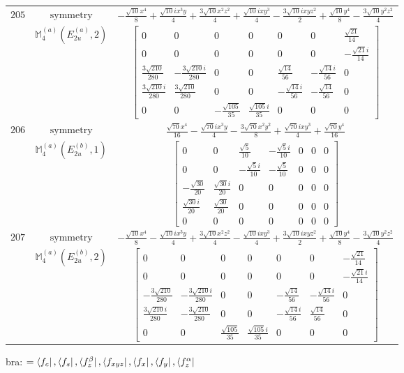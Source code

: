 \documentclass[fleqn,8pt,landscape]{jsarticle}
\begin{document}
\begin{longtable}{ccc}
$ 205 $ & $ \text{symmetry} $ & $ - \frac{\sqrt{10} x^{4}}{8} + \frac{\sqrt{10} i x^{3} y}{4} + \frac{3 \sqrt{10} x^{2} z^{2}}{4} + \frac{\sqrt{10} i x y^{3}}{4} - \frac{3 \sqrt{10} i x y z^{2}}{2} + \frac{\sqrt{10} y^{4}}{8} - \frac{3 \sqrt{10} y^{2} z^{2}}{4} $ \\
$  $ & $ \mathbb{M}_{4}^{(a)}(E_{2u}^{(a)},2) $ & $ \begin{bmatrix} 0 & 0 & 0 & 0 & 0 & 0 & \frac{\sqrt{21}}{14} \\ 0 & 0 & 0 & 0 & 0 & 0 & - \frac{\sqrt{21} i}{14} \\ \frac{3 \sqrt{210}}{280} & - \frac{3 \sqrt{210} i}{280} & 0 & 0 & \frac{\sqrt{14}}{56} & - \frac{\sqrt{14} i}{56} & 0 \\ \frac{3 \sqrt{210} i}{280} & \frac{3 \sqrt{210}}{280} & 0 & 0 & - \frac{\sqrt{14} i}{56} & - \frac{\sqrt{14}}{56} & 0 \\ 0 & 0 & - \frac{\sqrt{105}}{35} & \frac{\sqrt{105} i}{35} & 0 & 0 & 0 \end{bmatrix} $ \\ \hline
$ 206 $ & $ \text{symmetry} $ & $ \frac{\sqrt{70} x^{4}}{16} - \frac{\sqrt{70} i x^{3} y}{4} - \frac{3 \sqrt{70} x^{2} y^{2}}{8} + \frac{\sqrt{70} i x y^{3}}{4} + \frac{\sqrt{70} y^{4}}{16} $ \\
$  $ & $ \mathbb{M}_{4}^{(a)}(E_{2u}^{(b)},1) $ & $ \begin{bmatrix} 0 & 0 & \frac{\sqrt{5}}{10} & - \frac{\sqrt{5} i}{10} & 0 & 0 & 0 \\ 0 & 0 & - \frac{\sqrt{5} i}{10} & - \frac{\sqrt{5}}{10} & 0 & 0 & 0 \\ - \frac{\sqrt{30}}{20} & \frac{\sqrt{30} i}{20} & 0 & 0 & 0 & 0 & 0 \\ \frac{\sqrt{30} i}{20} & \frac{\sqrt{30}}{20} & 0 & 0 & 0 & 0 & 0 \\ 0 & 0 & 0 & 0 & 0 & 0 & 0 \end{bmatrix} $ \\ \hline
$ 207 $ & $ \text{symmetry} $ & $ - \frac{\sqrt{10} x^{4}}{8} - \frac{\sqrt{10} i x^{3} y}{4} + \frac{3 \sqrt{10} x^{2} z^{2}}{4} - \frac{\sqrt{10} i x y^{3}}{4} + \frac{3 \sqrt{10} i x y z^{2}}{2} + \frac{\sqrt{10} y^{4}}{8} - \frac{3 \sqrt{10} y^{2} z^{2}}{4} $ \\
$  $ & $ \mathbb{M}_{4}^{(a)}(E_{2u}^{(b)},2) $ & $ \begin{bmatrix} 0 & 0 & 0 & 0 & 0 & 0 & - \frac{\sqrt{21}}{14} \\ 0 & 0 & 0 & 0 & 0 & 0 & - \frac{\sqrt{21} i}{14} \\ - \frac{3 \sqrt{210}}{280} & - \frac{3 \sqrt{210} i}{280} & 0 & 0 & - \frac{\sqrt{14}}{56} & - \frac{\sqrt{14} i}{56} & 0 \\ \frac{3 \sqrt{210} i}{280} & - \frac{3 \sqrt{210}}{280} & 0 & 0 & - \frac{\sqrt{14} i}{56} & \frac{\sqrt{14}}{56} & 0 \\ 0 & 0 & \frac{\sqrt{105}}{35} & \frac{\sqrt{105} i}{35} & 0 & 0 & 0 \end{bmatrix} $ \\ \hline
\end{longtable}
bra: $=\bra{f_{c}}, \bra{f_{s}}, \bra{f_{z}^{\beta}}, \bra{f_{xyz}}, \bra{f_{x}}, \bra{f_{y}}, \bra{f_{z}^{\alpha}}$
\end{document}
